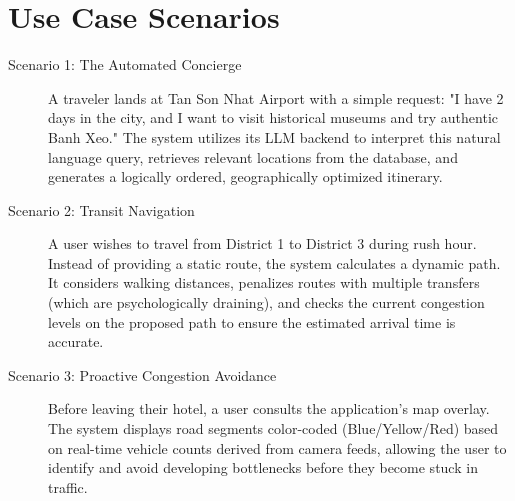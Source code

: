 \section{Use Case Scenarios}
\begin{description}
    \item[Scenario 1: The Automated Concierge] A traveler lands at Tan Son Nhat Airport with a simple request: "I have 2 days in the city, and I want to visit historical museums and try authentic Banh Xeo." The system utilizes its LLM backend to interpret this natural language query, retrieves relevant locations from the database, and generates a logically ordered, geographically optimized itinerary.
    
    \item[Scenario 2: Transit Navigation] A user wishes to travel from District 1 to District 3 during rush hour. Instead of providing a static route, the system calculates a dynamic path. It considers walking distances, penalizes routes with multiple transfers (which are psychologically draining), and checks the current congestion levels on the proposed path to ensure the estimated arrival time is accurate.
    
    \item[Scenario 3: Proactive Congestion Avoidance] Before leaving their hotel, a user consults the application's map overlay. The system displays road segments color-coded (Blue/Yellow/Red) based on real-time vehicle counts derived from camera feeds, allowing the user to identify and avoid developing bottlenecks before they become stuck in traffic.
\end{description}




